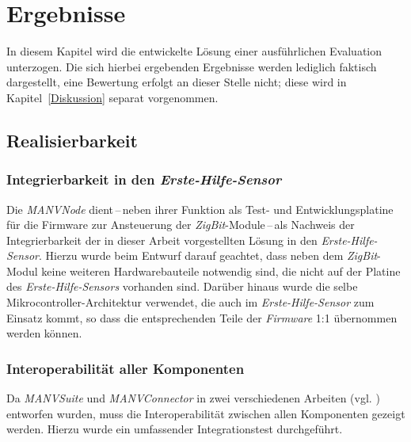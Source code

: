 


\chapter{Ergebnisse}\label{Ergebnisse}

In diesem Kapitel wird die entwickelte Lösung einer ausführlichen Evaluation unterzogen. Die sich hierbei
ergebenden Ergebnisse werden lediglich faktisch dargestellt, eine Bewertung erfolgt an dieser Stelle nicht;
diese wird in Kapitel~\ref{Diskussion} separat vorgenommen.


\section{Realisierbarkeit}
\subsection{Integrierbarkeit in den \emph{Erste-Hilfe-Sensor}}
Die \emph{MANVNode} dient\,--\,neben ihrer Funktion als Test- und Entwicklungsplatine für die Firmware zur 
Ansteuerung der \emph{ZigBit}-Module\,--\,als Nachweis der Integrierbarkeit der in dieser Arbeit vorgestellten
Lösung in den \emph{Erste-Hilfe-Sensor}. Hierzu wurde beim Entwurf darauf geachtet, dass neben dem
\emph{ZigBit}-Modul keine weiteren Hardwarebauteile notwendig sind, die nicht auf der Platine des
\emph{Erste-Hilfe-Sensors} vorhanden sind. Darüber hinaus wurde die selbe Mikrocontroller-Architektur
verwendet, die auch im \emph{Erste-Hilfe-Sensor} zum Einsatz kommt, so dass die entsprechenden
Teile der \emph{Firmware} 1:1 übernommen werden können.

\subsection{Interoperabilität aller Komponenten}
Da \emph{MANVSuite} und \emph{MANVConnector} in zwei verschiedenen Arbeiten (vgl. \cite{Jan}) 
entworfen wurden, muss die Interoperabilität zwischen allen Komponenten gezeigt werden. Hierzu
wurde ein umfassender Integrationstest durchgeführt.


